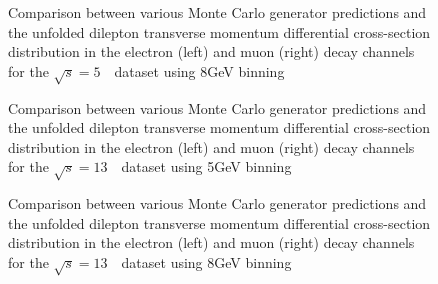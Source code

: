 \begin{figure}[h]
\centering
{}
\caption{Comparison between various Monte Carlo generator predictions and the unfolded dilepton transverse momentum differential cross-section distribution in the electron (left) and muon (right) \Zboson decay channels for the $\sqrt{s} = 5$~\TeV\ dataset using 8GeV binning}\label{f:MCData_Z_5_rebin8}
\end{figure}

\begin{figure}[h]
\centering
{}
\caption{Comparison between various Monte Carlo generator predictions and the unfolded dilepton transverse momentum differential cross-section distribution in the electron (left) and muon (right) \Zboson decay channels for the $\sqrt{s} = 13$~\TeV\ dataset using 5GeV binning}\label{f:MCData_Z_13}
\end{figure}

\begin{figure}[h]
\centering
{}
\caption{Comparison between various Monte Carlo generator predictions and the unfolded dilepton transverse momentum differential cross-section distribution in the electron (left) and muon (right) \Zboson decay channels for the $\sqrt{s} = 13$~\TeV\ dataset using 8GeV binning}\label{f:MCData_Z_13_rebin8}
\end{figure}


